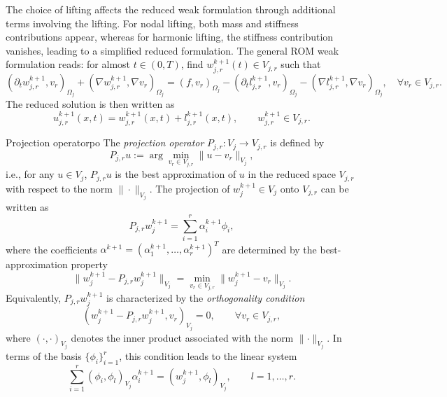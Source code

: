 \documentclass[a4paper, 11pt]{article}
\theoremstyle{remark}
\begin{document}
The choice of lifting affects the reduced weak formulation through additional terms involving the lifting. For nodal lifting, both mass and stiffness contributions appear, whereas for harmonic lifting, the stiffness contribution vanishes, leading to a simplified reduced formulation. The general ROM weak formulation reads: for almost $t \in (0,T)$, find $w_{j, r}^{k+1}(t) \in V_{j, r}$ such that
\begin{equation*}
    \left(\partial_{t} w_{j, r}^{k+1}, v_{r}\right)_{\Omega_{j}} + \left(\nabla w_{j, r}^{k+1}, \nabla v_{r}\right)_{\Omega_{j}} = \left(f, v_{r}\right)_{\Omega_{j}} - \left(\partial_{t} l_{j, r}^{k+1}, v_{r}\right)_{\Omega_{j}} - \left(\nabla l_{j, r}^{k+1}, \nabla v_{r}\right)_{\Omega_{j}}, \quad\forall v_{r}\in V_{j, r}.
\end{equation*}
\noindent The reduced solution is then written as
\begin{equation*}
    u_{j, r}^{k+1}(x, t) = w^{k+1}_{j, r}(x, t) + l_{j, r}^{k+1}(x, t), \qquad w^{k+1}_{j, r}\in V_{j, r}.
\end{equation*}
\begin{definition}{Projection operator}{po}
    The \textit{projection operator} $P_{j, r}: V_{j} \to V_{j, r}$ is defined by
    \begin{equation*}
        P_{j,r} u := \arg\min_{v_r \in V_{j,r}} \lVert u - v_r \rVert_{V_j},
    \end{equation*}
    i.e., for any $u \in V_j$, $P_{j,r} u$ is the best approximation of $u$ in the reduced space $V_{j,r}$ with respect to the norm $\|\cdot\|_{V_j}$. The projection of $w_j^{k+1}\in V_{j}$ onto $V_{j,r}$ can be written as
    \begin{equation*}
        P_{j,r} w_j^{k+1} = \sum_{i=1}^r \alpha_i^{k+1} \phi_i,
    \end{equation*}
    where the coefficients $\alpha^{k+1} = \left(\alpha_1^{k+1},\dots,\alpha_r^{k+1}\right)^{T}$ are determined by the best-approximation property
    \begin{equation*}
        \lVert w_j^{k+1} - P_{j,r} w_j^{k+1} \rVert_{V_j} = \min_{v_r \in V_{j,r}} \lVert w_j^{k+1} - v_r \rVert_{V_j}.
    \end{equation*}
    Equivalently, $P_{j,r} w_j^{k+1}$ is characterized by the \textit{orthogonality condition}
    \begin{equation*}
        \left(w_j^{k+1} - P_{j,r} w_j^{k+1}, v_r \right)_{V_j} = 0, \qquad \forall v_r \in V_{j,r},
    \end{equation*}
    where $(\cdot,\cdot)_{V_j}$ denotes the inner product associated with the norm $\lVert\cdot\rVert_{V_j}$. In terms of the basis $\{\phi_i\}_{i=1}^r$, this condition leads to the linear system
    \begin{equation*}
        \sum_{i=1}^r \left(\phi_i,\phi_l\right)_{V_j} \alpha_i^{k+1} = \left(w_j^{k+1},\phi_l\right)_{V_j}, \qquad l = 1,\ldots,r.
    \end{equation*}
\end{definition}
\end{document}
